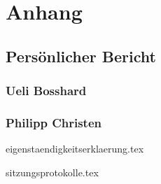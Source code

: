 \part{Anhang}

\chapter{Persönlicher Bericht}

\section{Ueli Bosshard}

\section{Philipp Christen}

{eigenstaendigkeitserklaerung.tex}

{sitzungsprotokolle.tex}
